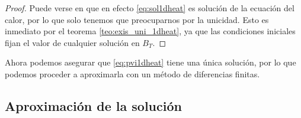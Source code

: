 \begin{proof}
	Puede verse en \cite{1dheat} que en efecto \ref{eq:sol1dheat} es solución de la ecuación del calor, por lo que solo tenemos que preocuparnos por la unicidad. Esto es inmediato por el teorema \ref{teo:exis_uni_1dheat}, ya que las condiciones iniciales fijan el valor de cualquier solución en $B_T$.
\end{proof}

Ahora podemos asegurar que \ref{eq:pvi1dheat} tiene una única solución, por lo que podemos proceder a aproximarla con un método de diferencias finitas.

\subsection{Aproximación de la solución}




